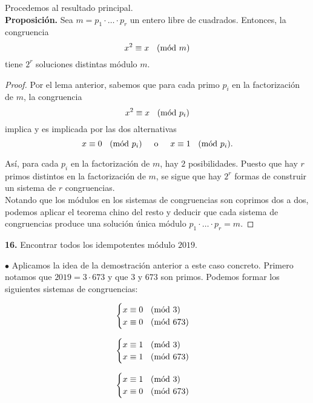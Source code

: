 \documentclass{article}
\newcommand{\Mod}[1]{\ \hspace{0.2cm} (\mathrm{m\acute{o}d}\ #1)}
\begin{document}
Procedemos al resultado principal.  \\

\textbf{Proposición. } Sea $m = p_{1} \cdot \ldots \cdot p_{r}$ un entero libre de cuadrados. Entonces, la congruencia
$$ x^{2} \equiv x  \Mod{m}$$
tiene $2^r$ soluciones distintas módulo $m$.
\begin{proof}
	Por el lema anterior, sabemos que para cada primo $p_{i}$ en la factorización de $m$, la congruencia
	$$ x^2 \equiv x \Mod{p_{i}} $$
	implica y es implicada por las dos alternativas
	$$ x \equiv 0 \Mod{p_{i}} \hspace{0.5cm} \text{o} \hspace{0.5cm} x \equiv 1 \Mod{p_{i}} . $$ 
	
Así, para cada $p_{i}$ en la factorización de $m$, hay $2$ posibilidades. Puesto que hay $r$ primos distintos en la factorización de $m$, se sigue que hay $2^r$ formas de construir un sistema de $r$ congruencias. \\
Notando que los módulos en los sistemas de congruencias son coprimos dos a dos, podemos aplicar el teorema chino del resto y deducir que cada sistema de congruencias produce una solución única módulo $p_{1} \cdot \ldots \cdot p_{r} = m.$

\end{proof}

\begin{mybox}
	\textbf{16. } Encontrar todos los idempotentes módulo $2019.$
\end{mybox}	

$\bullet$ Aplicamos la idea de la demostración anterior a este caso concreto. Primero notamos que $2019 = 3 \cdot 673$ y que $3$ y $673$ son primos. Podemos formar los siguientes sistemas de congruencias:

\begin{equation}
\begin{cases} x \equiv 0 \Mod{3} \\ x \equiv 0 \Mod{673} \end{cases}
\end{equation}

\begin{equation}
\begin{cases} x \equiv 1 \Mod{3} \\ x \equiv 1 \Mod{673} \end{cases}
\end{equation}


\begin{equation}
\begin{cases} x \equiv 1 \Mod{3} \\ x \equiv 0 \Mod{673} \end{cases}
\end{equation}
\end{document}
